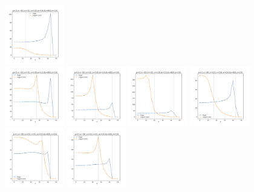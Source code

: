 \documentclass[a4paper]{article}
\begin{document}
\begin{figure}[H]
  \includegraphics[width=0.23\textwidth]{grid-g6-v2-w4_0}
  \\
  \includegraphics[width=0.23\textwidth]{grid-g6-v3-w1_0}
  \includegraphics[width=0.23\textwidth]{grid-g6-v3-w2_0}
  \includegraphics[width=0.23\textwidth]{grid-g6-v3-w3_0}
  \includegraphics[width=0.23\textwidth]{grid-g6-v3-w4_0}
  \\
  \includegraphics[width=0.23\textwidth]{grid-g6-v4-w1_0}
  \includegraphics[width=0.23\textwidth]{grid-g6-v4-w2_0}

\end{figure}
\end{document}
